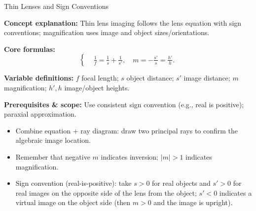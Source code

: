 \begin{KnowledgePoint}{Thin Lenses and Sign Conventions \Core}
  \KPFormulas
  \begin{formulabox}
  \textbf{Concept explanation:} Thin lens imaging follows the lens equation with sign conventions; magnification uses image and object sizes/orientations.
  
  \textbf{Core formulas:}
  \[
  \left\{\begin{aligned}
    &\frac{1}{f}=\frac{1}{s}+\frac{1}{s'},\quad m=-\frac{s'}{s}=\frac{h'}{h}.
  \end{aligned}\right.
  \]

  \textbf{Variable definitions:} $f$ focal length; $s$ object distance; $s'$ image distance; $m$ magnification; $h',h$ image/object heights.

  \textbf{Prerequisites \& scope:} Use consistent sign convention (e.g., real is positive); paraxial approximation.
  \end{formulabox}

  \KPHeuristics
  \begin{heuristicsbox}
  \begin{itemize}[leftmargin=*]
    \item Combine equation + ray diagram: draw two principal rays to confirm the algebraic image location.
    \item Remember that negative $m$ indicates inversion; $|m|>1$ indicates magnification.
    \item Sign convention (real-is-positive): take $s>0$ for real objects and $s'>0$ for real images on the opposite side of the lens from the object; $s'<0$ indicates a virtual image on the object side (then $m>0$ and the image is upright).
  \end{itemize}
  \end{heuristicsbox}


\end{KnowledgePoint}
